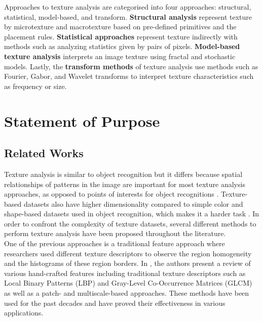 \documentclass[10pt,twocolumn,letterpaper]{article}
\begin{document}
 Approaches to texture analysis are categorised into four approaches: structural, statistical, model-based, and transform. {\bf Structural analysis} represent texture by microtexture and macrotexture based on pre-defined primitives and the placement rules. {\bf Statistical approaches} represent texture indirectly with methods such as analyzing statistics given by pairs of pixels. {\bf Model-based texture analysis} interprets an image texture using fractal and stochastic models. Lastly, the {\bf transform methods} of texture analysis use methods such as Fourier, Gabor, and Wavelet transforms to interpret texture characteristics such as frequency or size. \cite{Materka98textureanalysis}


\section{Statement of Purpose}


\subsection{Related Works}


\par Texture analysis is similar to object recognition but it differs because spatial relationships of patterns in the image are important for most texture analysis approaches, as opposed to points of interests for object recognitions \cite{Cavalin2017methods}. Texture-based datasets also have higher dimensionality compared to simple color and shape-based datasets used in object recognition, which makes it a harder task \cite{Basu2018deeptexture}. In order to confront the complexity of texture datasets, several different methods to perform texture analysis have been proposed throughout the literature.
\\


 One of the previous approaches is a traditional feature approach where researchers used different texture descriptors to observe the region homogeneity and the histograms of these region borders. In \cite{Basu2018deeptexture}, the authors present a review of various hand-crafted features including traditional texture descriptors such as Local Binary Patterns (LBP)\cite{Ojala2002lbp} and Gray-Level Co-Occurrence Matrices (GLCM)\cite{Haralick1973GLCM} as well as a patch- and multiscale-based approaches. These methods have been used for the past decades and have proved their effectiveness in various applications. 
 \\
 
\end{document}
